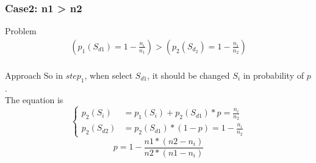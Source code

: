 \documentclass[notheorems, aspectratio=54]{beamer}
\begin{document}
\begin{frame}
    \frametitle{Case2: n1 > n2}
    \begin{block}{Problem}
        \begin{equation}
            \begin{aligned}
                (p_1(S_{d1}) = 1-\frac{n_i}{n_1}) > (p_2(S_{d_2}) = 1-\frac{n_i}{n_2}) \\
            \end{aligned}
        \end{equation}
    \end{block}
    \begin{block}{Approach}
        So in $step_1$, when select $S_{d1}$, it should be changed $S_{i}$ in probability of $p$. \\
        The equation is 
            \begin{equation}
                \left\{
                \begin{aligned}
                    p_2(S_i) &= p_1(S_i)+p_2(S_{d1})*p = \frac{n_i}{n_2} \\
                    p_2(S_{d2}) &= p_2(S_{d1})*(1-p) = 1-\frac{n_i}{n_2}
                \end{aligned}
                \right. 
            \end{equation}
            \begin{equation}
                p = 1-\frac{n1*(n2-n_i)}{n2*(n1-n_i)}
            \end{equation}
    \end{block}
\end{frame}
\end{document}
